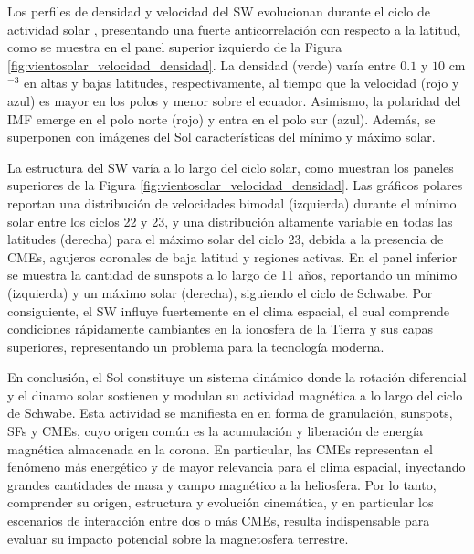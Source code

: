 Los perfiles de densidad y velocidad del \ac{SW} evolucionan durante el ciclo de actividad solar \parencite[e.g.,][]{mccomas-2000, mccomas-1998}, presentando una fuerte anticorrelación con respecto a la latitud, como se muestra en el panel superior izquierdo de la Figura \ref{fig:vientosolar_velocidad_densidad}. La densidad (verde) varía entre $0.1$ y $10$ cm$^{-3}$ en altas y bajas latitudes, respectivamente, al tiempo que la velocidad (rojo y azul) es mayor en los polos y menor sobre el ecuador. Asimismo, la polaridad del \ac{IMF} emerge en el polo norte (rojo) y entra en el polo sur (azul). Además, se superponen con imágenes del Sol características del mínimo y máximo solar. 

La estructura del \ac{SW} varía a lo largo del ciclo solar, como muestran los paneles superiores de la Figura \ref{fig:vientosolar_velocidad_densidad}. Las gráficos polares reportan una distribución de velocidades bimodal (izquierda) durante el mínimo solar entre los ciclos 22 y 23, y una distribución altamente variable en todas las latitudes (derecha) para el máximo solar del ciclo 23, debida a la presencia de \acp{CME}, agujeros coronales de baja latitud y regiones activas. En el panel inferior se muestra la cantidad de sunspots a lo largo de 11 años, reportando un mínimo (izquierda) y un máximo solar (derecha), siguiendo el ciclo de Schwabe. Por consiguiente, el \ac{SW} influye fuertemente en el clima espacial, el cual comprende condiciones rápidamente cambiantes en la ionosfera de la Tierra y sus capas superiores, representando un problema para la tecnología moderna.

En conclusión, el Sol constituye un sistema dinámico donde la rotación diferencial y el dinamo solar sostienen y modulan su actividad magnética a lo largo del ciclo de Schwabe. Esta actividad se manifiesta en en forma de granulación, sunspots, \acp{SF} y  \acp{CME}, cuyo origen común es la acumulación y liberación de energía magnética almacenada en la corona. En particular, las \acp{CME} representan el fenómeno más energético y de mayor relevancia para el clima espacial, inyectando grandes cantidades de masa y campo magnético a la heliosfera. Por lo tanto, comprender su origen, estructura y evolución cinemática, y en particular los escenarios de interacción entre dos o más CMEs, resulta indispensable para evaluar su impacto potencial sobre la magnetosfera terrestre.

